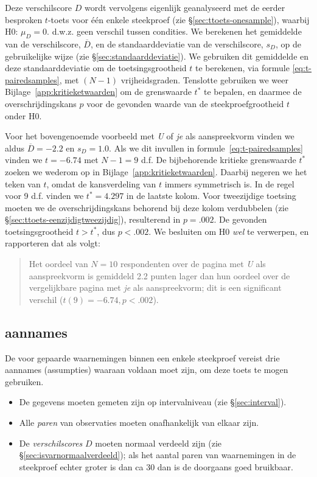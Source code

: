 \documentclass[
]{book}
\begin{document}
Deze verschilscore \(D\) wordt vervolgens eigenlijk geanalyseerd met de
eerder besproken \(t\)-toets voor één enkele steekproef (zie
§\ref{sec:ttoets-onesample}), waarbij H0: \(\mu_D=0\). d.w.z. geen verschil
tussen condities. We berekenen het gemiddelde van de verschilscore,
\(\overline{D}\), en de standaarddeviatie van de verschilscore, \(s_{D}\),
op de gebruikelijke wijze (zie
§\ref{sec:standaarddeviatie}). We gebruiken dit gemiddelde en deze
standaarddeviatie om de toetsingsgrootheid \(t\) te berekenen, via formule
\eqref{eq:t-pairedsamples}, met \((N-1)\) vrijheidsgraden. Tenslotte
gebruiken we weer
Bijlage~\ref{app:kritieketwaarden} om de grenswaarde \(t^*\) te bepalen, en
daarmee de overschrijdingskans \(p\) voor de gevonden waarde van de
steekproefgrootheid \(t\) onder H0.

Voor het bovengenoemde voorbeeld met \emph{U} of \emph{je} als aanspreekvorm
vinden we aldus \(\overline{D}=-2.2\) en \(s_D=1.0\). Als we dit invullen in
formule~\eqref{eq:t-pairedsamples} vinden we \(t=-6.74\) met \(N-1=9\) d.f. De
bijbehorende kritieke grenswaarde \(t^*\) zoeken we wederom op in
Bijlage~\ref{app:kritieketwaarden}. Daarbij negeren we het teken van \(t\),
omdat de kansverdeling van \(t\) immers symmetrisch is. In de regel voor 9
d.f. vinden we \(t^*=4.297\) in de laatste kolom. Voor tweezijdige
toetsing moeten we de overschrijdingskans behorend bij deze kolom
verdubbelen (zie
§\ref{sec:ttoets-eenzijdigtweezijdig}), resulterend in \(p=.002\).
De gevonden toetsingsgrootheid \(t > t^*\), dus \(p<.002\). We besluiten om
H0 \emph{wel} te verwerpen, en rapporteren dat als volgt:

\begin{quote}
Het oordeel van \(N=10\) respondenten over de pagina met \emph{U} als
aanspreekvorm is gemiddeld 2.2 punten lager dan hun oordeel over de
vergelijkbare pagina met \emph{je} als aanspreekvorm; dit is een
significant verschil (\(t(9)=-6.74, p<.002\)).
\end{quote}

\hypertarget{aannames-1}{%
\subsection{aannames}\label{aannames-1}}

De voor gepaarde waarnemingen binnen een enkele steekproef vereist drie
aannames (assumpties) waaraan voldaan moet zijn, om deze toets te mogen
gebruiken.

\begin{itemize}
\item
  De gegevens moeten gemeten zijn op intervalniveau (zie
  §\ref{sec:interval}).
\item
  Alle \emph{paren} van observaties moeten onafhankelijk van elkaar
  zijn.
\item
  De \emph{verschilscores} \(D\) moeten normaal verdeeld zijn (zie
  §\ref{sec:isvarnormaalverdeeld}); als het aantal paren van
  waarnemingen in de steekproef echter groter is dan ca 30 dan is de
  doorgaans goed bruikbaar.
\end{itemize}
\end{document}
